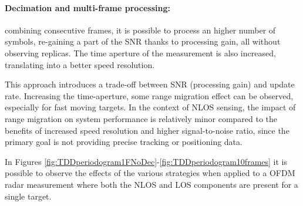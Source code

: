      \paragraph{Decimation and multi-frame processing:}
     combining consecutive frames, it is possible to process an higher number of symbols, re-gaining a part of the SNR thanks to processing gain, all without observing replicas. The time aperture of the measurement is also increased, translating into a better speed resolution.

     This approach introduces a trade-off between SNR (processing gain) and update rate. Increasing the time-aperture, some range migration effect can be observed, especially for fast moving targets. In the context of NLOS sensing, the impact of range migration on system performance is relatively minor compared to the benefits of increased speed resolution and higher signal-to-noise ratio, since the primary goal is not providing precise tracking or positioning data.


    In Figures \ref{fig:TDDperiodogram1FNoDec}-\ref{fig:TDDperiodogram10frames} it is possible to observe the effects of the various strategies when applied to a OFDM radar measurement where both the NLOS and LOS components are present for a single target.



